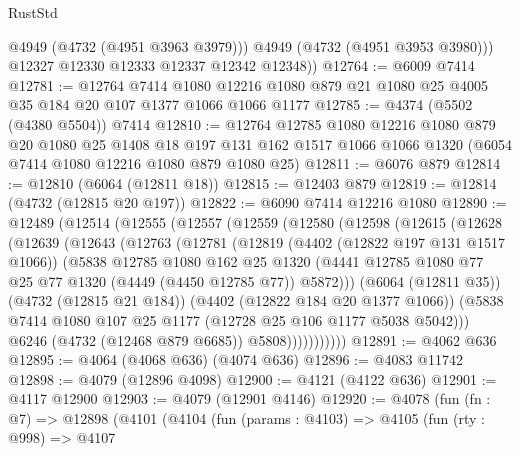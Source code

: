 \begin{lexlean}{RustStd}
\begin{coremodule}
            @4949
            (@4732 (@4951 @3963 @3979)))
          @4949
          (@4732 (@4951 @3953 @3980)))
        @12327
        @12330
        @12333
        @12337
        @12342
        @12348))
@12764 := @6009 @7414
@12781 := @12764
    @7414
    @1080
    @12216
    @1080
    @879
    @21
    @1080
    @25
    @4005
    @35
    @184
    @20
    @107
    @1377
    @1066
    @1066
    @1177
@12785 := @4374 (@5502 (@4380 @5504)) @7414
@12810 := @12764
    @12785
    @1080
    @12216
    @1080
    @879
    @20
    @1080
    @25
    @1408
    @18
    @197
    @131
    @162
    @1517
    @1066
    @1066
    @1320
    (@6054 @7414 @1080 @12216 @1080 @879 @1080 @25)
@12811 := @6076 @879
@12814 := @12810 (@6064 (@12811 @18))
@12815 := @12403 @879
@12819 := @12814 (@4732 (@12815 @20 @197))
@12822 := @6090 @7414 @12216 @1080
@12890 := @12489
    (@12514
      (@12555
        (@12557
          (@12559
            (@12580
              (@12598
                (@12615
                  (@12628
                    (@12639
                      (@12643
                        (@12763
                          (@12781
                            (@12819
                              (@4402 (@12822 @197 @131 @1517 @1066))
                              (@5838
                                @12785
                                @1080
                                @162
                                @25
                                @1320
                                (@4441
                                  @12785
                                  @1080
                                  @77
                                  @25
                                  @77
                                  @1320
                                  (@4449 (@4450 @12785 @77))
                                  @5872)))
                            (@6064 (@12811 @35))
                            (@4732 (@12815 @21 @184))
                            (@4402 (@12822 @184 @20 @1377 @1066))
                            (@5838 @7414 @1080 @107 @25 @1177 (@12728 @25 @106 @1177 @5038 @5042)))
                          @6246
                          (@4732 (@12468 @879 @6685))
                          @5808)))))))))))
@12891 := @4062 @636
@12895 := @4064 (@4068 @636) (@4074 @636)
@12896 := @4083 @11742
@12898 := @4079 (@12896 @4098)
@12900 := @4121 (@4122 @636)
@12901 := @4117 @12900
@12903 := @4079 (@12901 @4146)
@12920 := @4078
    (fun (fn : @7) =>
    @12898
      (@4101
        (@4104
          (fun (params : @4103) =>
          @4105
            (fun (rty : @998) =>
            @4107

\end{coremodule}
\end{lexlean}

